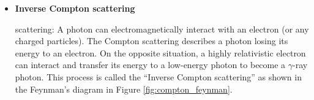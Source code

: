 
\begin{itemize}
    \item \textbf{Inverse Compton scattering}
    
    scattering: A photon can electromagnetically interact with an
    electron (or any charged particles). The Compton scattering
    describes a photon losing its energy to an electron.
    On the opposite situation, a highly relativistic electron
    can interact and transfer its energy to a low-energy photon
    to become a $\gamma$-ray photon. This process is called the
    ``Inverse Compton scattering'' as shown in the Feynman's
    diagram in Figure \ref{fig:compton_feynman}.




\end{itemize}
